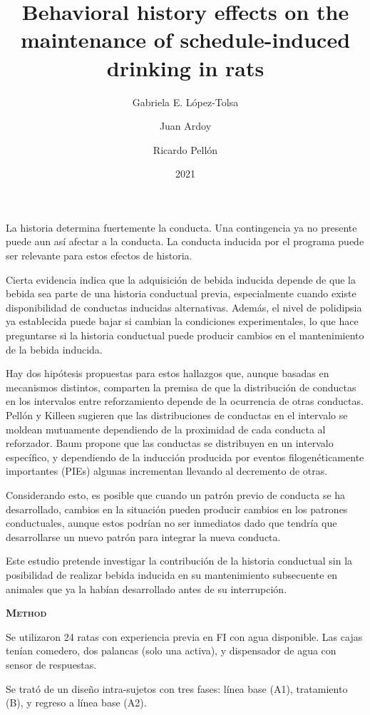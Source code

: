 \documentclass[a4paper,12pt]{article}
\title{Behavioral history effects on the maintenance of schedule-induced drinking in rats}
\author{Gabriela E. López-Tolsa \and Juan Ardoy \and Ricardo Pellón}
\date{2021}
\begin{document}
{\scshape\bfseries \maketitle}

La historia determina fuertemente la conducta. Una contingencia ya no presente puede aun así afectar a la conducta. La conducta inducida por el programa puede ser relevante para estos efectos de historia.

Cierta evidencia indica que la adquisición de bebida inducida depende de que la bebida sea parte de una historia conductual previa, especialmente cuando existe disponibilidad de conductas inducidas alternativas. Además, el nivel de polidipsia ya establecida puede bajar si cambian la condiciones experimentales, lo que hace preguntarse si la historia conductual puede producir cambios en el mantenimiento de la bebida inducida.

Hay dos hipótesis propuestas para estos hallazgos que, aunque basadas en mecanismos distintos, comparten la premisa de que la distribución de conductas en los intervalos entre reforzamiento depende de la ocurrencia de otras conductas. Pellón y Killeen sugieren que las distribuciones de conductas en el intervalo se moldean mutuamente dependiendo de la proximidad de cada conducta al reforzador. Baum propone que las conductas se distribuyen en un intervalo específico, y dependiendo de la inducción producida por eventos filogenéticamente importantes (PIEs) algunas incrementan llevando al decremento de otras.

Considerando esto, es posible que cuando un patrón previo de conducta se ha desarrollado, cambios en la situación pueden producir cambios en los patrones conductuales, aunque estos podrían no ser inmediatos dado que tendría que desarrollarse un nuevo patrón para integrar la nueva conducta.

Este estudio pretende investigar la contribución de la historia conductual sin la posibilidad de realizar bebida inducida en su mantenimiento subsecuente en animales que ya la habían desarrollado antes de su interrupción.

{\scshape\bfseries Method}

Se utilizaron 24 ratas con experiencia previa en FI con agua disponible. Las cajas tenían comedero, dos palancas (solo una activa), y dispensador de agua con sensor de respuestas.

Se trató de un diseño intra-sujetos con tres fases: línea base (A1), tratamiento (B), y regreso a línea base (A2).
\end{document}
